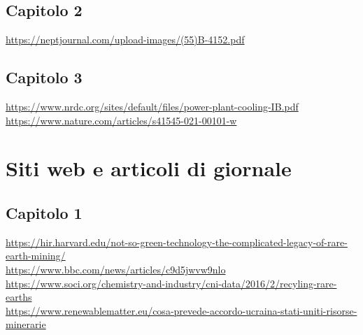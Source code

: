 \documentclass[12pt,a4paper,oneside]{book}
\begin{document}
\subsection*{Capitolo 2}
\url{https://neptjournal.com/upload-images/(55)B-4152.pdf}

\subsection*{Capitolo 3}
\url{https://www.nrdc.org/sites/default/files/power-plant-cooling-IB.pdf}\\
\url{https://www.nature.com/articles/s41545-021-00101-w}

\section*{Siti web e articoli di giornale}
\subsection*{Capitolo 1}
\url{https://hir.harvard.edu/not-so-green-technology-the-complicated-legacy-of-rare-earth-mining/} \\
\url{https://www.bbc.com/news/articles/c9d5jwvw9nlo} \\
\url{https://www.soci.org/chemistry-and-industry/cni-data/2016/2/recyling-rare-earths}\\
\url{https://www.renewablematter.eu/cosa-prevede-accordo-ucraina-stati-uniti-risorse-minerarie}
\end{document}
